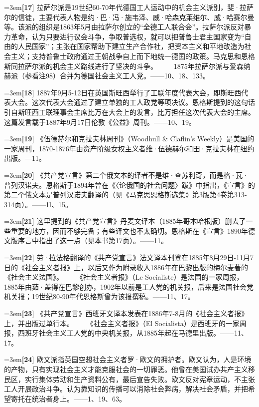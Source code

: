 \documentclass[UTF8,zihao=-4,a4paper]{ctexart}
\begin{document}
\noindent\hangindent=3em\textbf{[17]} 拉萨尔派是19世纪60-70年代德国工人运动中的机会主义派别，斐·拉萨尔的信徒，主要代表人物是约·巴·冯·施韦泽、威·哈森克莱维尔、威·哈赛尔曼等。该派的组织是1863年5月由拉萨尔创立的“全德工人联合会”。拉萨尔派反对暴力革命，认为只要进行议会斗争，争取普选权，就可以把普鲁士君主国家变为“自由的人民国家”；主张在国家帮助下建立生产合作社，把资本主义和平地改造为社会主义；支持普鲁士政府通过王朝战争自上而下地统一德国的政策。马克思和恩格斯同拉萨尔派的机会主义路线进行了坚决的斗争。  　　1875年拉萨尔派与爱森纳赫派（参看注98）合并为德国社会主义工人党。——10、18、133。\par
\noindent\hangindent=3em\textbf{[18]} 1887年9月5-12日在英国斯旺西举行了工联年度代表大会，即斯旺西代表大会。这次代表大会通过了建立单独的工人政党等项决议。恩格斯提到的这句话引自斯旺西工联理事会主席比万在大会上的发言，比万担任这次代表大会的主席。这篇发言载于1887年9月17日伦敦《公益》周刊。——10、19。\par
\noindent\hangindent=3em\textbf{[19]} 《伍德赫尔和克拉夫林周刊》（Woodhull \& Claflin’s Weekly）是美国的一家周刊，1870-1876年由资产阶级女权主义者维·伍德赫尔和田·克拉夫林在纽约出版。—11。\par
\noindent\hangindent=3em\textbf{[20]} 《共产党宣言》第二个俄文本的译者不是维·查苏利奇，而是格·瓦·普列汉诺夫。恩格斯于1894年曾在《〈论俄国的社会问题〉跋》中指出，《宣言》的第二个俄文本是普列汉诺夫翻译的（见《马克思恩格斯选集》第3版第4卷第313-314页）。——1l、15。\par
\noindent\hangindent=3em\textbf{[21]} 这里提到的《共产党宣言》丹麦文译本（1885年哥本哈根版）删去了一些重要的地方，因而不够完备；有些译文也不太确切。恩格斯在《宣言》1890年德文版序言中指出了这一点（见本书第17页）。——11。\par
\noindent\hangindent=3em\textbf{[22]} 劳·拉法格翻译的《共产党宣言》法文译本刊登在1885年8月29日-11月7日的《社会主义者报》上，以后又作为附录收入1886年在巴黎出版的梅尔麦著的《社会主义法国》。  　　《社会主义者报》（Le Socialiste）是法国的一家周报，1885年由茹·盖得在巴黎创办，1902年以前是工人党的机关报，后来是法国社会党机关报；19世纪80-90年代恩格斯曾为该报撰稿。——11、17。\par
\noindent\hangindent=3em\textbf{[23]} 《共产党宣言》西班牙文译本发表在1886年7-8月的《社会主义者报》上，并出版过单行本。  　　《社会主义者报》（El Socialista）是西班牙的一家周报，西班牙社会主义工人党的中央机关报，从1885年起在马德里出版。——11、17。\par
\noindent\hangindent=3em\textbf{[24]} 欧文派指英国空想社会主义者罗·欧文的拥护者。欧文认为，人是环境的产物，只有实现社会主义才能克服社会的一切罪恶。他曾在美国试办共产主义移民区，实行集体劳动和生产资料公有，最后宣告失败。欧文反对宪章运动，不主张工人开展政治斗争。认为靠知识的传播可以消除社会弊病，解决社会矛盾，并把希望寄托在统治者身上。——1、19、63。\par
\end{document}
